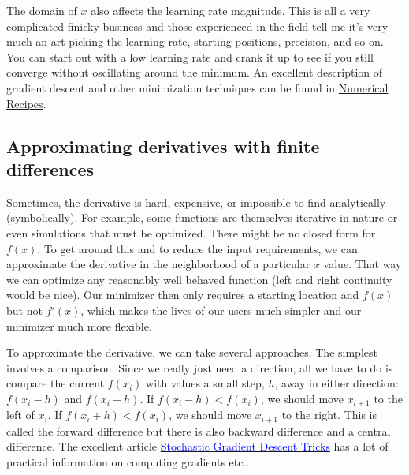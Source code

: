 \begin{fullwidth}

The domain of $x$ also affects the learning rate magnitude. This is all a very complicated finicky business and those experienced in the field tell me it's very much an art picking the learning rate, starting positions, precision, and so on. You can start out with a low learning rate and crank it up to see if you still converge without oscillating around the minimum.  \noindent An excellent description of gradient descent and other minimization techniques can be found in \href{http://apps.nrbook.com/fortran/index.html}{Numerical Recipes}.

\subsection{Approximating derivatives with finite differences}

Sometimes, the derivative is hard, expensive, or impossible to find analytically (symbolically).  For example, some functions are themselves iterative in nature or even simulations that must be optimized. There might be no closed form for $f(x)$. To get around this and to reduce the input requirements, we can approximate the derivative in the neighborhood of a particular $x$ value. That way we can optimize any reasonably well behaved function (left and right continuity would be nice). Our minimizer then only requires a starting location and $f(x)$ but not $f'(x)$, which makes the lives of our users much simpler and our minimizer much more flexible. 

To approximate the derivative, we can take several approaches. The simplest involves a comparison. Since we really just need a direction, all we have to do is compare the current $f(x_i)$ with values a small step, $h$, away in either direction: $f(x_{i}-h)$ and $f(x_{i}+h)$.  If $f(x_{i}-h) < f(x_{i})$, we should move $x_{i+1}$ to the left of $x_{i}$. If $f(x_{i}+h) < f(x_{i})$, we should move $x_{i+1}$ to the right.  This is called the forward difference but there is also backward difference and a central difference. The excellent article \href{http://research.microsoft.com/pubs/192769/tricks-2012.pdf}{\textcolor{blue}{Stochastic Gradient Descent Tricks}} has a lot of practical information on computing gradients etc...


\end{fullwidth}
